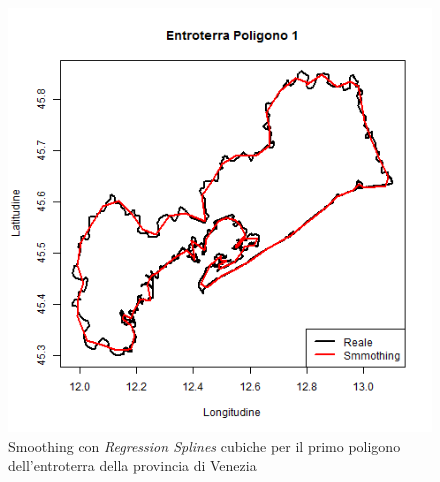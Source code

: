 \documentclass[a4paper,11pt,twoside,openright]{book}							%
\begin{document}
\begin{figure}[!t]
\begin{minipage}{.32\textwidth}
\end{minipage}%
\begin{minipage}{.64\textwidth}
\includegraphics[width=\textwidth]{Immagini/Ven_Regione.png}
\end{minipage}
\caption{Smoothing con \textit{Regression Splines} cubiche per il primo poligono dell'entroterra della provincia di Venezia}
\label{fig:Ven_ent1}
\end{figure}
\end{document}
